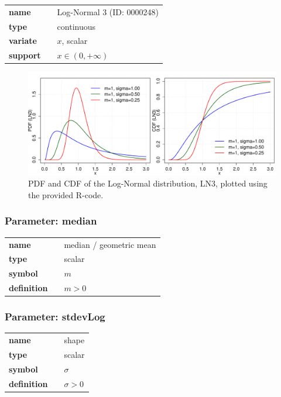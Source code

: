  \bigskip 

\begin{tabular}{p{2cm}cl}
\textbf{name} & & Log-Normal 3 (ID: 0000248)\\ 
 
\textbf{type} & & continuous \\ 

\textbf{variate} & & $x$, scalar \\ 

\textbf{support} & & $x \in (0,+\infty)$
\end{tabular}

\begin{figure}[htb!]
\centering
  \includegraphics[width=140mm]{pics/LogNormal3_pdf_cdf}
 \caption{PDF and CDF of the Log-Normal distribution, LN3,
 plotted using the provided R-code.}
 \label{fig:LN3pdfcdf}
\end{figure}

\subsubsection*{Parameter: median}

\noindent\begin{tabular}{p{2cm}cl}
\textbf{name} & & median / geometric mean \\
\textbf{type} & & scalar \\
\textbf{symbol} & & $m$  \\
\textbf{definition} & & $m>0$
\end{tabular}



\subsubsection*{Parameter: stdevLog}

\noindent\begin{tabular}{p{2cm}cl}
\textbf{name} & & shape \\
\textbf{type} & & scalar \\
\textbf{symbol} & & $\sigma$  \\
\textbf{definition} & & $\sigma > 0$
\end{tabular}
